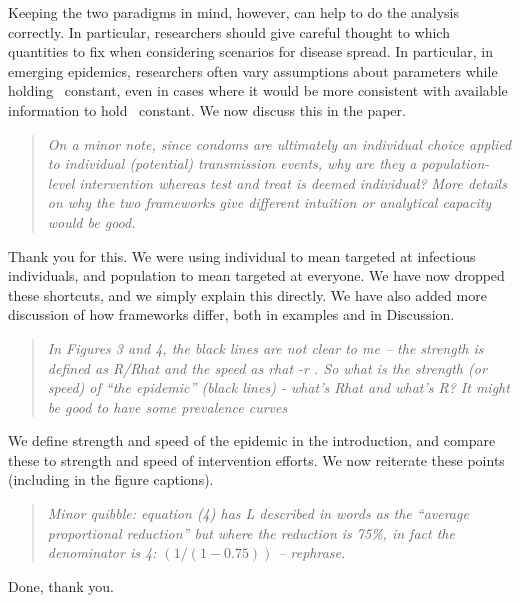 Keeping the two paradigms in mind, however, can help to do the analysis correctly. 
In particular, researchers should give careful thought to which quantities to fix when considering scenarios for disease spread. 
In particular, in emerging epidemics, researchers often vary assumptions about parameters while holding \RR\ constant, even in cases where it would be more consistent with available information to hold \rr\ constant.
We now discuss this in the paper.

\begin{quote}\sl
On a minor note, since condoms are ultimately an individual choice
applied to individual (potential) transmission events, why are they a
population-level intervention whereas test and treat is deemed
individual? More details on why the two frameworks give different
intuition or analytical capacity would be good.
\end{quote}

Thank you for this. We were using individual to mean targeted at
infectious individuals, and population to mean targeted at everyone. We
have now dropped these shortcuts, and we simply explain this directly. We have also added more discussion of how frameworks differ, both in examples and in Discussion.


\begin{quote}\sl
In Figures 3 and 4, the black lines are not clear to me -- the strength
is defined as R/Rhat and the speed as rhat -r . So what is the strength
(or speed) of ``the epidemic'' (black lines) - what's Rhat and what's R?
It might be good to have some prevalence curves
\end{quote}

We define strength and speed of the epidemic in the introduction, and
compare these to strength and speed of intervention efforts. We now
reiterate these points (including in the figure captions).

\begin{quote}\sl
Minor quibble: equation (4) has L described in words as the ``average
proportional reduction'' but where the reduction is 75\%, in fact the
denominator is 4: $(1 / (1-0.75) )$ -- rephrase.
\end{quote}

Done, thank you.

